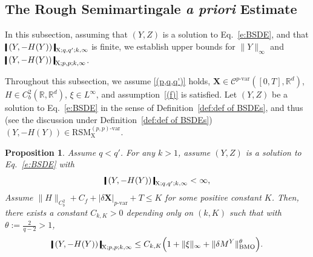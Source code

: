 \documentclass[11pt,reqno]{amsart}
\newtheorem{proposition}[lemma]{Proposition}
\numberwithin{equation}{section}
\newcommand{\shortthickbar}{%
  \vcenter{\hbox{\rule{1.8pt}{2.2ex}}}%
}
\newcommand{\thicknm}[1]{%
  \mathopen{\shortthickbar}%
  \mkern4mu #1 \mkern4mu%
  \mathclose{\shortthickbar}%
}
\begin{document}
\subsection{The Rough Semimartingale \emph{a priori} Estimate}\label{subsec:a priori estimate}

In this subsection, assuming that $(Y,Z)$ is a solution to Eq.~\eqref{e:BSDE}, and that $\thicknm{(Y,-H(Y))}_{\mathrm X;q,q';k,\infty}$ is finite, we establish upper bounds for $\|Y\|_{\infty}$ and $\thicknm{(Y,-H(Y))}_{\mathrm X;p,p;k,\infty}$. 

Throughout this subsection, we assume \ref{(p,q,q')} holds, $\mathbf X\in \mathscr{C}^{p\text{-}\mathrm{var}}([0,T], \mathbb R^d)$, $H\in C^{2}_{b}(\mathbb R,\mathbb R^d)$, $\xi \in L^{\infty}$, and assumption~\ref{(f)} is satisfied. Let $(Y,Z)$ be a solution to Eq.~\eqref{e:BSDE} in the sense of Definition~\ref{def:def of BSDEs}, and thus (see the discussion under Definition~\ref{def:def of BSDEs}) $(Y,-H(Y)) \in \mathrm{RSM}^{(p,p)\text{-}\mathrm{var}}_{\mathrm X}$. 

\begin{proposition}\label{prop:bounded by BMO}
Assume $q<q'$. For any $k>1$, assume $(Y,Z)$ is a solution to Eq.~\eqref{e:BSDE} with 
\begin{equation}\label{e:cond that Psi < infty}
\thicknm{(Y,-H(Y))}_{\mathrm X;q,q';k,\infty} < \infty, 
\end{equation}
Assume $\|H\|_{C^{2}_b} + C_f + |\delta \mathbf X |_{p\text{-}\mathrm{var}} + T \le K$ for some positive constant $K$.  Then, there exists a constant $C_{k,K} > 0$ depending only on $(k,K)$ such that with $\theta := {\frac{2}{q-2}} > 1$,
\begin{equation}\label{e:bound-Psi}
{ \thicknm{(Y,-H(Y))}_{\mathrm X;p,p;k,\infty} \le C_{k,K} \Big(1+ \|\xi\|_{\infty} + 
\|\delta M^{Y}\|^{\theta}_{\mathrm{BMO}} \Big). }
\end{equation}
\end{proposition}
\end{document}
